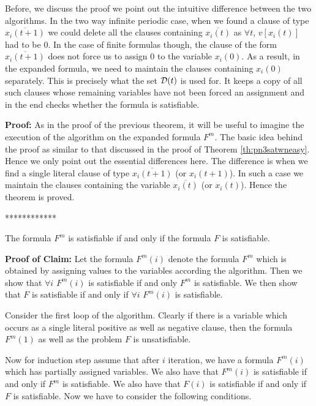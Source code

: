 Before, we discuss the proof we point out the intuitive difference between the
two algorithms. In the
two way infinite periodic case, when we found a clause of type 
$\overline{x_i(t+1)}$
we could delete all the clauses containing 
$\overline{x_i(t)}$ as $\forall t$, $v[x_i(t)]$ had to be 0.
In the case of finite formulas though, the clause of the form 
$\overline{x_i(t+1)}$ does 
not force us to assign 0 to the variable $x_i(0)$. As a result, in the expanded
formula, we need to maintain the clauses containing $x_i(0)$ separately.
This is precisely what the set ${\cal D}(t)$ is used for. 
It keeps a copy of all such clauses
whose remaining variables  have not been forced an assignment and in the end
checks whether the formula is satisfiable.



\noindent
{\bf Proof:} As in the proof of the previous theorem, it will be useful to
imagine the execution of the algorithm on the expanded formula $F^m$.
The basic idea behind the proof as similar to that discussed in the proof
of Theorem \ref{th:pn3satwneasy}. Hence we only point out the essential
differences here. The difference is when we find a single literal clause
of type $\overline{x_i(t+1)}$ (or $x_i(t+1)$). In such a case we maintain
the clauses containing the variable $\overline{x_i(t)}$ (or $x_i(t)$).
Hence the theorem is proved.\QED





\iffalse*************
\begin{claim}
The formula $F^m$ is satisfiable if and only if the formula $F$ is satisfiable.
\end{claim}

\noindent
{\bf Proof of Claim:} Let the formula $F^m(i)$ denote the formula $F^m$ 
which is obtained by assigning values to the variables according the 
algorithm. Then we show that $\forall i$ $F^m(i)$ is satisfiable if and
only $F^m$ is satisfiable. We then show that $F$ is satisfiable if and
only if $\forall i$ $F^m(i)$ is satisfiable.

Consider the first loop of the algorithm. Clearly if there is a variable which
occurs as a single literal positive as well as negative clause, then the
formula $F^m(1)$ as well as the problem $F$ is unsatisfiable.

Now for induction step assume that after $i$ iteration, we have a formula
$F^m(i)$ which has partially assigned variables. We also have that $F^m(i)$ is
satisfiable if and only if $F^m$ is satisfiable. We also have that $F(i)$ is
satisfiable if and only if $F$ is satisfiable. Now we have to consider the 
following conditions.

